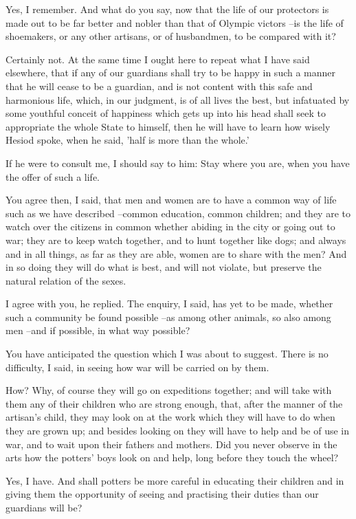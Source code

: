Yes, I remember.
And what do you say, now that the life of our protectors is made out to be far better and nobler than that of Olympic victors --is the life of shoemakers, or any other artisans, or of husbandmen, to be compared with it?

Certainly not.
At the same time I ought here to repeat what I have said elsewhere, that if any of our guardians shall try to be happy in such a manner that he will cease to be a guardian, and is not content with this safe and harmonious life, which, in our judgment, is of all lives the best, but infatuated by some youthful conceit of happiness which gets up into his head shall seek to appropriate the whole State to himself, then he will have to learn how wisely Hesiod spoke, when he said, 'half is more than the whole.'

If he were to consult me, I should say to him: Stay where you are, when you have the offer of such a life.

You agree then, I said, that men and women are to have a common way of life such as we have described --common education, common children; and they are to watch over the citizens in common whether abiding in the city or going out to war; they are to keep watch together, and to hunt together like dogs; and always and in all things, as far as they are able, women are to share with the men? And in so doing they will do what is best, and will not violate, but preserve the natural relation of the sexes.

I agree with you, he replied.
The enquiry, I said, has yet to be made, whether such a community be found possible --as among other animals, so also among men --and if possible, in what way possible?

You have anticipated the question which I was about to suggest.
There is no difficulty, I said, in seeing how war will be carried on by them.

How?
Why, of course they will go on expeditions together; and will take with them any of their children who are strong enough, that, after the manner of the artisan's child, they may look on at the work which they will have to do when they are grown up; and besides looking on they will have to help and be of use in war, and to wait upon their fathers and mothers. Did you never observe in the arts how the potters' boys look on and help, long before they touch the wheel?

Yes, I have.
And shall potters be more careful in educating their children and in giving them the opportunity of seeing and practising their duties than our guardians will be?

